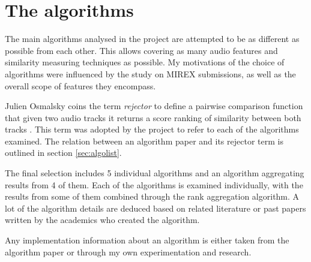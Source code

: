 
\chapter{The algorithms}
\label{chap:algorithms}
\ifpdf
    \graphicspath{{Algorithms/Figures/PNG/}{EvaluationTask/Figures/PDF/}{Algorithms/Figures/}}
\else
    \graphicspath{{Algorithms/Figures/EPS/}{EvaluationTask/Figures/}}
\fi


The main algorithms analysed in the project are attempted to be as different as
possible from each other. This allows covering as many audio features and
similarity measuring techniques as possible. My motivations of the choice of
algorithms were influenced by the study on MIREX submissions, as well as the
overall scope of features they encompass. 

Julien Osmalsky coins the term \textit{rejector} to define a pairwise comparison
function that given two audio tracks it returns a score ranking of similarity
between both tracks \cite{osmalsky2015combining}. This term was adopted by the
project to refer to each of the algorithms examined. The relation between an
algorithm paper and its rejector term is outlined in section \ref{sec:algolist}.

The final selection includes 5 individual algorithms and an algorithm
aggregating results from 4 of them. Each of the algorithms is examined
individually, with the results from some of them combined through the rank
aggregation algorithm. A lot of the algorithm details are deduced based on
related literature or past papers written by the academics who created the algorithm.

Any implementation information about an algorithm is either taken from the
algorithm paper or through my own experimentation and research.

